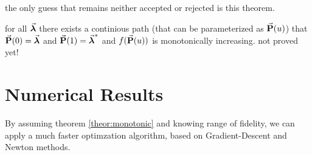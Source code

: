 \documentclass{article}
\begin{document}
the only guess that remains neither accepted or rejected is this theorem.

\begin{theorem}
\label{theor:monotonic}
  for all $\va*{\lambda}$ there exists a continious path (that can be parameterized as $\va{P}(u)$) that $\va{P}(0) = \va*{\lambda}$
and $\va{P}(1) = \va*{\lambda}^*$ and $f(\va{P}(u))$ is monotonically increasing. not proved yet!
\end{theorem}

\section{Numerical Results}

By assuming theorem \ref{theor:monotonic} and knowing range of fidelity, we can apply a much faster optimzation algorithm, based on Gradient-Descent and Newton methods.
\end{document}
